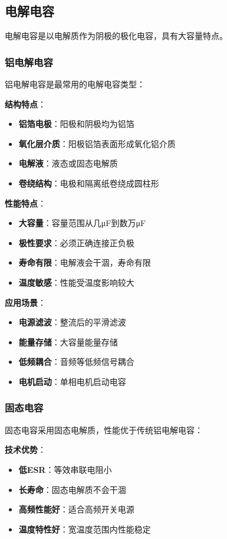 \documentclass[12pt,UTF8]{ctexbook}
\begin{document}
\subsection{电解电容}

电解电容是以电解质作为阴极的极化电容，具有大容量特点。

\subsubsection{铝电解电容}

铝电解电容是最常用的电解电容类型：

\textbf{结构特点}：
\begin{itemize}[leftmargin=3.5em]
    \item \textbf{铝箔电极}：阳极和阴极均为铝箔
    \item \textbf{氧化层介质}：阳极铝箔表面形成氧化铝介质
    \item \textbf{电解液}：液态或固态电解质
    \item \textbf{卷绕结构}：电极和隔离纸卷绕成圆柱形
\end{itemize}

\textbf{性能特点}：
\begin{itemize}[leftmargin=3.5em]
    \item \textbf{大容量}：容量范围从几μF到数万μF
    \item \textbf{极性要求}：必须正确连接正负极
    \item \textbf{寿命有限}：电解液会干涸，寿命有限
    \item \textbf{温度敏感}：性能受温度影响较大
\end{itemize}

\textbf{应用场景}：
\begin{itemize}[leftmargin=3.5em]
    \item \textbf{电源滤波}：整流后的平滑滤波
    \item \textbf{能量存储}：大容量能量存储
    \item \textbf{低频耦合}：音频等低频信号耦合
    \item \textbf{电机启动}：单相电机启动电容
\end{itemize}

\subsubsection{固态电容}

固态电容采用固态电解质，性能优于传统铝电解电容：

\textbf{技术优势}：
\begin{itemize}[leftmargin=3.5em]
    \item \textbf{低ESR}：等效串联电阻小
    \item \textbf{长寿命}：固态电解质不会干涸
    \item \textbf{高频性能好}：适合高频开关电源
    \item \textbf{温度特性好}：宽温度范围内性能稳定
\end{itemize}
\end{document}
